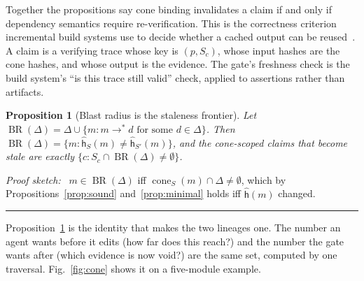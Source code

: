 \documentclass[conference]{IEEEtran}
\newtheorem{proposition}{Proposition}
\newenvironment{proof}[1][Proof]{\par\noindent\textit{#1:}\ \ignorespaces}{\hfill\rule{0.45em}{0.45em}\par}
\newcommand{\cone}{\operatorname{cone}}
\newcommand{\BR}{\operatorname{BR}}
\newcommand{\chash}{\hat{\mathsf{h}}}
\begin{document}
Together the propositions say cone binding invalidates a claim if and only if dependency semantics require re-verification. This is the correctness criterion incremental build systems use to decide whether a cached output can be reused~\citep{mokhov2018build}. A claim is a verifying trace whose key is $(p, S_c)$, whose input hashes are the cone hashes, and whose output is the evidence. The gate's freshness check is the build system's ``is this trace still valid'' check, applied to assertions rather than artifacts.

\begin{proposition}[Blast radius is the staleness frontier]
\label{prop:radius}
Let $\BR(\Delta) = \Delta \cup \{m : m \to^{*} d \text{ for some } d \in \Delta\}$. Then $\BR(\Delta) = \{m : \chash_S(m) \neq \chash_{S'}(m)\}$, and the cone-scoped claims that become stale are exactly $\{c : S_c \cap \BR(\Delta) \neq \emptyset\}$.
\end{proposition}
\begin{proof}[Proof sketch]
$m \in \BR(\Delta)$ iff $\cone_S(m) \cap \Delta \neq \emptyset$, which by Propositions~\ref{prop:sound} and~\ref{prop:minimal} holds iff $\chash(m)$ changed.
\end{proof}

Proposition~\ref{prop:radius} is the identity that makes the two lineages one. The number an agent wants before it edits (how far does this reach?) and the number the gate wants after (which evidence is now void?) are the same set, computed by one traversal. Fig.~\ref{fig:cone} shows it on a five-module example.
\end{document}
